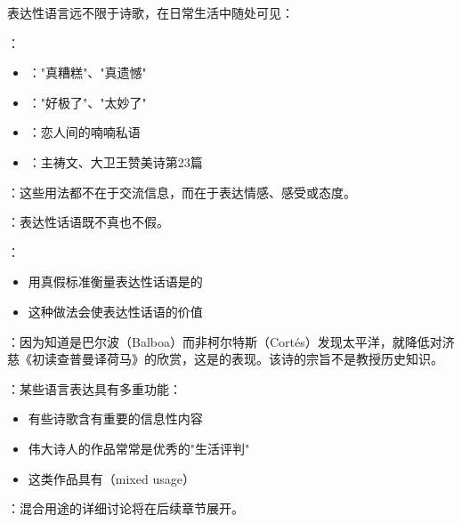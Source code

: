 \begin{examplebox}[title=表达性语言的多样形式]
表达性语言远不限于诗歌，在日常生活中随处可见：

：
\begin{itemize}
  \item {}："真糟糕"、"真遗憾"
  \item {}："好极了"、"太妙了"
  \item {}：恋人间的喃喃私语
  \item {}：主祷文、大卫王赞美诗第23篇
\end{itemize}

：这些用法都不在于交流信息，而在于表达情感、感受或态度。
\end{examplebox}

\begin{theorembox}[title=表达性话语的真假问题]
：表达性话语既不真也不假。

：
\begin{itemize}
  \item 用真假标准衡量表达性话语是的
  \item 这种做法会使表达性话语的价值
\end{itemize}

：因为知道是巴尔波（Balboa）而非柯尔特斯（Cortés）发现太平洋，就降低对济慈《初读查普曼译荷马》的欣赏，这是的表现。该诗的宗旨不是教授历史知识。
\end{theorembox}

\begin{theorembox}[title=混合用途的概念]
：某些语言表达具有多重功能：
\begin{itemize}
  \item 有些诗歌含有重要的信息性内容
  \item 伟大诗人的作品常常是优秀的"生活评判"
  \item 这类作品具有（mixed usage）
\end{itemize}

：混合用途的详细讨论将在后续章节展开。
\end{theorembox}

